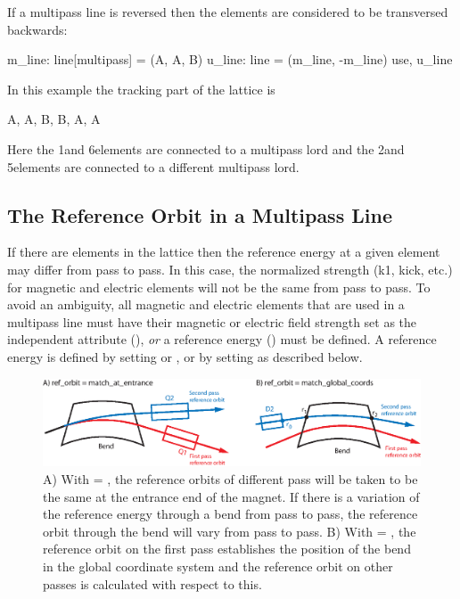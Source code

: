 If a multipass line is reversed then the elements are considered to be
transversed backwards:
\begin{example}
  m_line: line[multipass] = (A, A, B)
  u_line: line = (m_line, -m_line)
  use, u_line
\end{example}
In this example the tracking part of the lattice is
\begin{example}
  A, A, B, B, A, A
\end{example}
Here the 1\St and 6\Th elements are connected to a multipass lord and the
2\Nd and 5\Th elements are connected to a different multipass lord.

\subsection{The Reference Orbit in a Multipass Line}

If there are  elements in the lattice then the reference
energy at a given element may differ from pass to pass. In this case,
the normalized strength (k1, kick, etc.) for magnetic and electric
elements will not be the same from pass to pass. To avoid an
ambiguity, all magnetic and electric elements that are used in a
multipass line must have their magnetic or electric field strength set
as the independent attribute (), {\em or} a reference
energy () must be defined. A reference energy is
defined by setting  or , or by setting
 as described below. 

\begin{figure}[tb]
\centering 
\includegraphics[width=6.2in]{multipass_bend.eps} 
\caption[The reference orbit with a multipass bend.]  
{A) With  = , the reference orbits
of different pass will be taken to be the same at the entrance end of
the magnet. If there is a variation of the reference energy through a
bend from pass to pass, the reference orbit through the bend will vary
from pass to pass. B) With  = ,
the reference orbit on the first pass establishes the position of the
bend in the global coordinate system and the reference orbit on other
passes is calculated with respect to this.}
\label{f:multipass.bend}
\end{figure}


